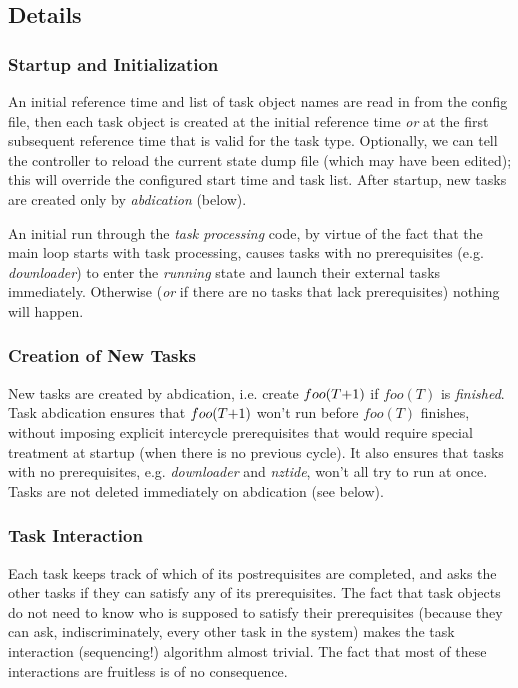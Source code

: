 \documentclass[11pt,a4paper]{article}
\begin{document}
\subsection{Details}

\subsubsection{Startup and Initialization}

An initial reference time and list of task object names are read in from
the config file, then each task object is created at the initial
reference time {\em or} at the first subsequent reference time that is
valid for the task type. Optionally, we can tell the controller to
reload the current state dump file (which may have been edited); this
will override the configured start time and task list. After startup,
new tasks are created only by {\em abdication} (below).

An initial run through the {\em task processing} code, by virtue of the
fact that the main loop starts with task processing, causes tasks with
no prerequisites (e.g. {\em downloader}) to enter the {\em running}
state and launch their external tasks immediately. Otherwise ({\em or}
if there are no tasks that lack prerequisites) nothing will happen.



\subsubsection{Creation of New Tasks}

New tasks are created by abdication, i.e. create $foo(T\negmedspace
+\negmedspace 1)$ if $foo(T)$ is {\em finished}.  Task abdication
ensures that $foo(T\negmedspace +\negmedspace 1)$ won't run before
$foo(T)$ finishes, without imposing explicit intercycle prerequisites
that would require special treatment at startup (when there is no
previous cycle).  It also ensures that tasks with no prerequisites, e.g.
{\em downloader} and {\em nztide}, won't all try to run at once.
Tasks are not deleted immediately on abdication (see below).


\subsubsection{Task Interaction} 

Each task keeps track of which of its postrequisites are completed, and
asks the other tasks if they can satisfy any of its prerequisites.  The
fact that task objects do not need to know who is supposed to satisfy
their prerequisites (because they can ask, indiscriminately, every other
task in the system) makes the task interaction (sequencing!) algorithm
almost trivial. The fact that most of these interactions are fruitless
is of no consequence. 
\end{document}
